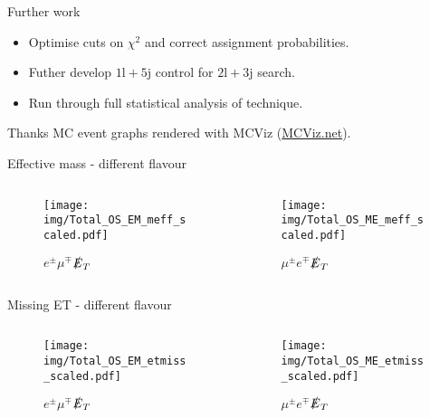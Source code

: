 \documentclass{beamer}
\begin{document}
\begin{frame}{Further work}
  \begin{itemize}
    \item Optimise cuts on $\chi^2$ and correct assignment probabilities.
    \item Futher develop $1\text{l}+5\text{j}$ control for $2\text{l}+3\text{j}$ search.
    \item Run through full statistical analysis of technique.
  \end{itemize}
\end{frame}

\begin{frame}{Thanks}
  MC event graphs rendered with MCViz (\url{MCViz.net}).
\end{frame}

\begin{frame}{Effective mass - different flavour}
  \begin{columns}
    \begin{column}{0.45\textwidth}\begin{figure}
      \caption{$e^{\pm}\mu^{\mp}$$\slashed{E}_{T}$}
      \texttt{[image: img/Total\_OS\_EM\_meff\_scaled.pdf]}
    \end{figure}\end{column}
    \begin{column}{0.45\textwidth}\begin{figure}
      \caption{$\mu^{\pm}e^{\mp}$$\slashed{E}_{T}$}
      \texttt{[image: img/Total\_OS\_ME\_meff\_scaled.pdf]}
    \end{figure}\end{column}
  \end{columns}
\end{frame}

\begin{frame}{Missing ET - different flavour}
  \begin{columns}
    \begin{column}{0.45\textwidth}\begin{figure}
      \caption{$e^{\pm}\mu^{\mp}$$\slashed{E}_{T}$}
      \texttt{[image: img/Total\_OS\_EM\_etmiss\_scaled.pdf]}
    \end{figure}\end{column}
    \begin{column}{0.45\textwidth}\begin{figure}
      \caption{$\mu^{\pm}e^{\mp}$$\slashed{E}_{T}$}
      \texttt{[image: img/Total\_OS\_ME\_etmiss\_scaled.pdf]}
    \end{figure}\end{column}
  \end{columns}
\end{frame}
\end{document}
